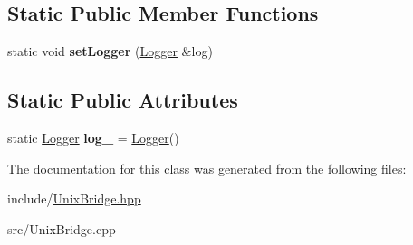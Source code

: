 \subsection*{Static Public Member Functions}
\begin{DoxyCompactItemize}
\item 
\hypertarget{classUnixBridge_a2f081bb6ceae9693c1160b3530c937ca}{static void {\bfseries set\-Logger} (\hyperlink{classLogger}{Logger} \&log)}\label{classUnixBridge_a2f081bb6ceae9693c1160b3530c937ca}

\end{DoxyCompactItemize}
\subsection*{Static Public Attributes}
\begin{DoxyCompactItemize}
\item 
\hypertarget{classUnixBridge_a92b187da548fa7346ed7d7eecec22a32}{static \hyperlink{classLogger}{Logger} {\bfseries log\-\_\-} = \hyperlink{classLogger}{Logger}()}\label{classUnixBridge_a92b187da548fa7346ed7d7eecec22a32}

\end{DoxyCompactItemize}


The documentation for this class was generated from the following files\-:\begin{DoxyCompactItemize}
\item 
include/\hyperlink{UnixBridge_8hpp}{Unix\-Bridge.\-hpp}\item 
src/Unix\-Bridge.\-cpp\end{DoxyCompactItemize}
